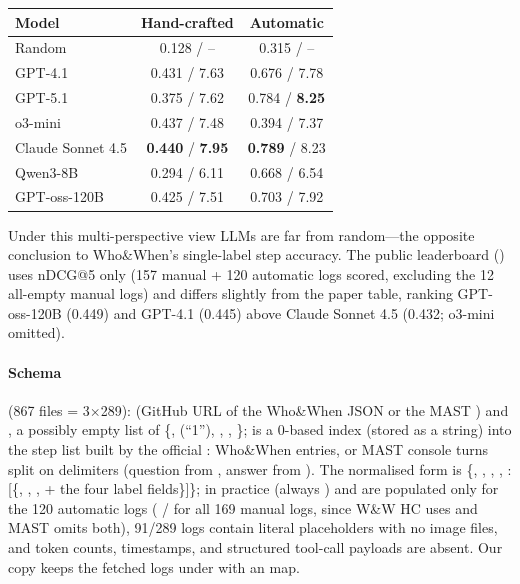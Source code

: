 \begin{center}\small
\begin{tabular}{@{}lcc@{}}\toprule
Model & Hand-crafted & Automatic\\\midrule
Random & 0.128 / -- & 0.315 / --\\
GPT-4.1 & 0.431 / 7.63 & 0.676 / 7.78\\
GPT-5.1 & 0.375 / 7.62 & 0.784 / \textbf{8.25}\\
o3-mini & 0.437 / 7.48 & 0.394 / 7.37\\
Claude Sonnet 4.5 & \textbf{0.440} / \textbf{7.95} & \textbf{0.789} / 8.23\\
Qwen3-8B & 0.294 / 6.11 & 0.668 / 6.54\\
GPT-oss-120B & 0.425 / 7.51 & 0.703 / 7.92\\\bottomrule
\end{tabular}
\end{center}
Under this multi-perspective view LLMs are far from random---the opposite conclusion to Who\&When's single-label step accuracy. The public leaderboard () uses nDCG@5 only (157 manual + 120 automatic logs scored, excluding the 12 all-empty manual logs) and differs slightly from the paper table, ranking GPT-oss-120B (0.449) and GPT-4.1 (0.445) above Claude Sonnet 4.5 (0.432; o3-mini omitted).

\paragraph{Schema}  (867 files = 3$\times$289):  (GitHub URL of the Who\&When JSON or the MAST ) and , a possibly empty list of \{,  (``1''), , , \};  is a 0-based index (stored as a string) into the step list built by the official : Who\&When  entries, or MAST console turns split on  delimiters (question from , answer from ). The normalised form is \{, , , , :[\{, , , + the four label fields\}]\}; in practice  (always ) and  are populated only for the 120 automatic logs ( / \code{\{\}} for all 169 manual logs, since W\&W HC uses  and MAST omits both), 91/289 logs contain literal  placeholders with no image files, and token counts, timestamps, and structured tool-call payloads are absent. Our copy keeps the fetched logs under  with an  map.

